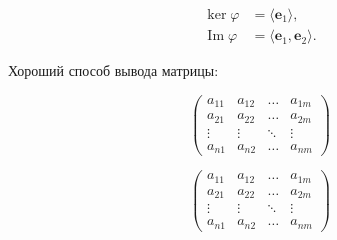 \documentclass[a4paper,12pt]{article}
\DeclareMathOperator{\im}{\mathop{Im}} %
\begin{document}
\begin{align*}
	\ker \varphi &= \langle\textbf{e}_1\rangle,\\
	\im \varphi &= \langle\textbf{e}_1, \textbf{e}_2\rangle
.\end{align*}

Хороший способ вывода матрицы:

\[ 
\left( 
\begin{array}{cccc} 
a_{11} & a_{12} & \ldots & a_{1m}\\ 
a_{21} & a_{22} & \ldots & a_{2m}\\ 
\vdots & \vdots & \ddots & \vdots\\ 
a_{n1} & a_{n2} & \ldots & a_{nm} 
\end{array} 
\right) 
\] 

\[ 
\begin{pmatrix} 
a_{11} & a_{12} & \ldots & a_{1m} \\
a_{21} & a_{22} & \ldots & a_{2m} \\
\vdots & \vdots & \ddots & \vdots \\
a_{n1} & a_{n2} & \ldots & a_{nm} 
\end{pmatrix} 
\]
\end{document}
